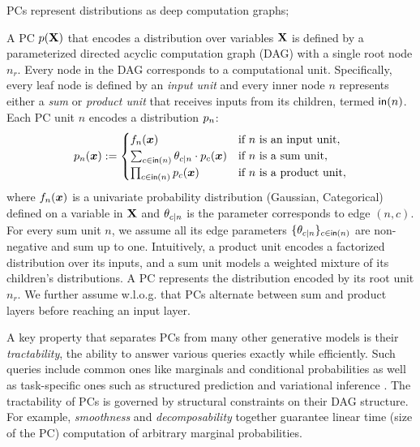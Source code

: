 \documentclass{article} %
\begin{document}
PCs represent distributions as deep computation graphs;

\begin{defn}
\label{def:pc}
A PC ${p}(\mathbf{X})$ that encodes a distribution over variables $\mathbf{X}$ is defined by a parameterized directed acyclic computation graph (DAG) with a single root node $n_r$. Every node in the DAG corresponds to a computational unit. Specifically, every leaf node is defined by an \emph{input unit} and every inner node $n$ represents either a \emph{sum} or \emph{product unit} that receives inputs from its children, termed $\mathsf{in}(n)$. Each PC unit $n$ encodes a distribution ${p}_{n}$:
    \begin{align}
        {p}_{n} (\boldsymbol{x}) := \begin{cases}
            f_{n} (\boldsymbol{x}) & \text{if~}n\text{~is~an~input~unit}, \\
            \sum_{c \in \mathsf{in}(n)} \theta_{c\vert n} \cdot {p}_{c} (\boldsymbol{x}) & \text{if~}n\text{~is~a~sum~unit}, \\
            \prod_{c \in \mathsf{in}(n)} {p}_{c} (\boldsymbol{x}) & \text{if~}n\text{~is~a~product~unit},
        \end{cases}
        \label{eq:pc-def}
    \end{align}
\noindent where $f_{n}(\boldsymbol{x})$ is a univariate probability distribution (\eg Gaussian, Categorical) defined on a variable in $\mathbf{X}$ and $\theta_{c \vert n}$ is the parameter corresponds to edge $(n, c)$. For every sum unit $n$, we assume all its edge parameters $\{\theta_{c \vert n}\}_{c \in \mathsf{in}(n)}$ are non-negative and sum up to one. Intuitively, a product unit encodes a factorized distribution over its inputs, and a sum unit models a weighted mixture of its children's distributions. A PC represents the distribution encoded by its root unit $n_r$. We further assume w.l.o.g. that PCs alternate between sum and product layers before reaching an input layer.
\end{defn}

A key property that separates PCs from many other generative models is their \emph{tractability}, \ie the ability to answer various queries exactly while efficiently. Such queries include common ones like marginals and conditional probabilities as well as task-specific ones such as structured prediction \citep{shao2022conditional} and variational inference \citep{shih2020probabilistic}. The tractability of PCs is governed by structural constraints on their DAG structure. For example, \emph{smoothness} and \emph{decomposability} together guarantee linear time (\wrt size of the PC) computation of arbitrary marginal probabilities.
\end{document}
